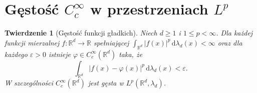 \documentclass[11pt,a4paper,oneside]{book}
\numberwithin{equation}{chapter}
\theoremstyle{plain}
\newtheorem{twierdzenie}{Twierdzenie}[chapter]
\theoremstyle{definition}
\theoremstyle{remark}
\begin{document}
\section{Gęstość $C_c^\infty$ w przestrzeniach $L^p$}

\begin{twierdzenie}[Gęstość funkcji gładkich]
\label{thm:cc-in-lp-10}
Niech $d\ge1$ i $1\le p<\infty$.
Dla każdej funkcji mierzalnej
$f:\mathbb R^d\to\mathbb R$ spełniającej
$\int_{\mathbb R^d}|f(x)|^p\,\mathrm d\lambda_d(x)
<\infty$ oraz dla każdego $\varepsilon>0$
istnieje $\varphi\in C_c^\infty(\mathbb R^d)$ taka, że
\begin{equation}\label{eq:lp-smooth-dense-10}
\int_{\mathbb R^d}|f(x)-\varphi(x)|^p
\,\mathrm d\lambda_d(x)<\varepsilon.
\end{equation}
W szczególności $C_c^\infty(\mathbb R^d)$ jest
gęsta w $L^p(\mathbb R^d,\lambda_d)$.
\end{twierdzenie}
\end{document}
